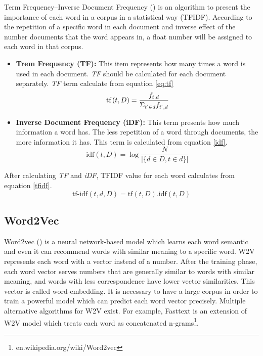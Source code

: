 Term Frequency–Inverse Document Frequency (\cite{tfidf}) is an algorithm to present the importance of each word in a corpus in a statistical way (\ac{TFIDF}). According to the repetition of a specific word in each document and inverse effect of the number documents that the word appears in, a float number will be assigned to each word in that corpus.  
\begin{itemize}
	\item \textbf{Trem Frequency (TF):} This item represents how many times a word is used in each document. \textit{TF} should be calculated for each document separately. \textit{TF} term calculate from equation \ref{eq:tf}
	\begin{equation}
	\label{eq:tf}
	\text{tf} \left(t,D\right) = \frac{f_{t,d}}{\Sigma_{t^{`} \in d } f_{t^{`}, d}}
	\end{equation}
	
	\item \textbf{Inverse Document Frequency (iDF):} This term presents how much information a word has. The less repetition of a word through documents, the more information it has. This term is calculated from equation \ref{idf}. 
	\begin{equation}
	\label{idf}
	\text{idf} \left( t,D\right) = \log \frac{N}{\left|\{d\in D, t \in d\}\right| }
	\end{equation}
\end{itemize}

\noindent
After calculating \textit{TF} and \textit{iDF}, \ac{TFIDF} value for each word calculates from equation \ref{tfidf}.
\begin{equation}
\label{tfidf}
\text{tf-idf}\left(t,d,D\right) =  \text{tf} \left( t,D\right) . \text{idf} \left( t,D\right)
\end{equation}


\subsection{Word2Vec}
Word2vec (\cite{word2vec}) is a neural network-based model which learns each word semantic and even it can recommend words with similar meaning to a specific word. \ac{W2V} represents each word with a vector instead of a number. After the training phase, each word vector serves numbers that are generally similar to words with similar meaning, and words with less correspondence have lower vector similarities. This vector is called word-embedding. It is necessary to have a large corpus in order to train a powerful model which can predict each word vector precisely. Multiple alternative algorithms for \ac{W2V} exist. For example, Fasttext is an extension of \ac{W2V} model which treats each word as concatenated n-grams\footnote{en.wikipedia.org/wiki/Word2vec}.  



